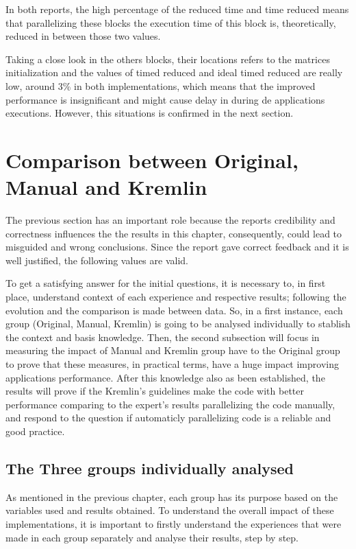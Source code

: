 In both reports, the high percentage of the reduced time and time reduced means that parallelizing these blocks the execution time of this block is, theoretically, reduced in between those two values. 

Taking a close look in the others blocks, their locations refers to the matrices initialization and the values of timed reduced and ideal timed reduced are really low, around 3\% in both implementations, which means that the improved performance is insignificant and might cause delay in during de applications executions. However, this situations is confirmed in the next section. 


\section{Comparison between Original, Manual and Kremlin}

The previous section has an important role because the reports credibility and correctness influences the the results in this chapter, consequently, could lead to misguided and wrong conclusions. Since the report gave correct feedback and it is well justified, the following values are valid.

To get a satisfying answer for the initial questions, it is necessary to, in first place, understand context of each experience and respective results; following the evolution and the comparison is made between data. So, in a first instance, each group (Original, Manual, Kremlin) is going to be analysed individually to stablish the context and basis knowledge. Then, the second subsection will focus in measuring the impact of Manual and Kremlin group have to the Original group to prove that these measures, in practical terms, have a huge impact improving applications performance. After this knowledge also as been established, the results will prove if the Kremlin's guidelines make the code with better performance comparing to the expert's results parallelizing the code manually, and respond to the question if  automaticly parallelizing code is a reliable and good practice.

\subsection{The Three groups individually analysed}

As mentioned in the previous chapter, each group has its purpose
based on the variables used and results obtained. To understand the overall impact of these implementations, it is important to firstly understand the experiences that were made in each group separately and analyse their results, step by step.

